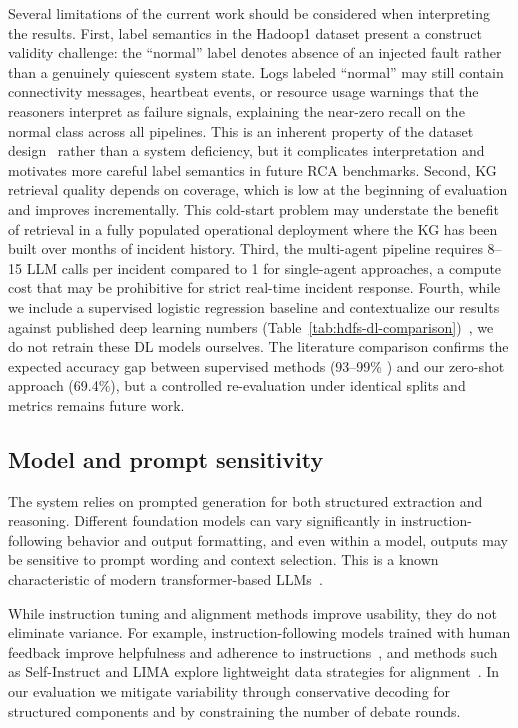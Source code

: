 Several limitations of the current work should be considered when interpreting the results.
First, label semantics in the Hadoop1 dataset present a construct validity challenge: the
``normal'' label denotes absence of an injected fault rather than a genuinely quiescent system
state. Logs labeled ``normal'' may still contain connectivity messages, heartbeat events, or
resource usage warnings that the reasoners interpret as failure signals, explaining the near-zero
recall on the normal class across all pipelines. This is an inherent property of the dataset
design~\cite{he2020loghub} rather than a system deficiency, but it complicates interpretation
and motivates more careful label semantics in future RCA benchmarks. Second, KG retrieval quality
depends on coverage, which is low at the beginning of evaluation and improves incrementally. This
cold-start problem may understate the benefit of retrieval in a fully populated operational
deployment where the KG has been built over months of incident history. Third, the multi-agent
pipeline requires 8--15 LLM calls per incident compared to 1 for single-agent approaches, a
compute cost that may be prohibitive for strict real-time incident response. Fourth, while we include a supervised logistic regression baseline and contextualize
our results against published deep learning numbers
(Table~\ref{tab:hdfs-dl-comparison})~\cite{du2017deeplog,guo2021logbert,zhang2019logrobust,ijcai2019p658},
we do not retrain these DL models ourselves. The literature comparison confirms the expected
accuracy gap between supervised methods (93--99\% \fone{}) and our zero-shot approach (69.4\%),
but a controlled re-evaluation under identical splits and metrics remains future work.

\subsection{Model and prompt sensitivity}
The system relies on prompted generation for both structured extraction and reasoning. Different
foundation models can vary significantly in instruction-following behavior and output formatting,
and even within a model, outputs may be sensitive to prompt wording and context selection. This is
a known characteristic of modern transformer-based
LLMs~\cite{vaswani2023attentionneed,brown2020languagemodelsfewshotlearners}.

While instruction tuning and alignment methods improve usability, they do not eliminate variance.
For example, instruction-following models trained with human feedback improve helpfulness and
adherence to instructions~\cite{ouyang2022traininglanguagemodelsfollow}, and methods such as
Self-Instruct and LIMA explore lightweight data strategies for
alignment~\cite{wang2023selfinstructaligninglanguagemodels,zhou2023limaalignment}. In our
evaluation we mitigate variability through conservative decoding for structured components and by
constraining the number of debate rounds.

